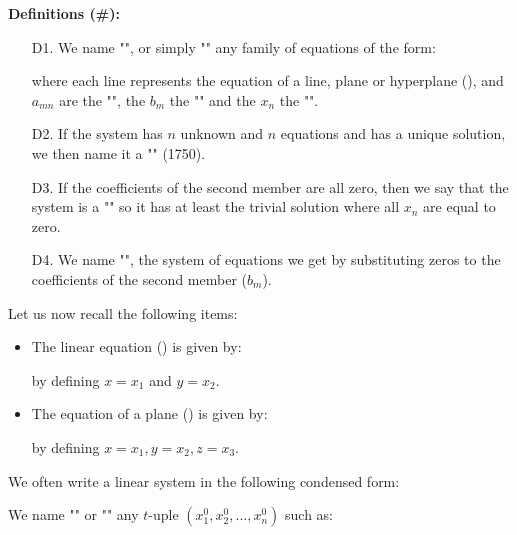 \textbf{Definitions (\#\mydef):}
\begin{enumerate}
	\item[D1.] We name "", or simply "" any family of equations of the form:
	
where each line represents the equation of a line, plane or hyperplane (), and $a_{mn}$ are the "", the $b_m$ the "" and the $x_n$ the "".

	\item[D2.] If the system has $n$ unknown and $n$ equations and has a unique solution, we then name it a "" (1750).\label{unique solution linear system}
	
	\item[D3.] If the coefficients of the second member are all zero, then we say that the system is a "" so it has at least the trivial solution where all $x_n$ are equal to zero.
	
	\item[D4.] We name "", the system of equations we get by substituting zeros to the coefficients of the second member ($b_m$).
	\end{enumerate}
Let us now recall the following items:
	\begin{itemize}
		\item The linear equation () is given by:
			
		by defining $x=x_1$ and $y=x_2$.
		
		\item The equation of a plane () is given by:
			
		by defining $x=x_1, y=x_2, z=x_3$.
	\end{itemize}
We often write a linear system in the following condensed form:
	
We name "" or "" any $t$-uple $(x_1^0,x_2^0,...,x_n^0)$ such as:
	
